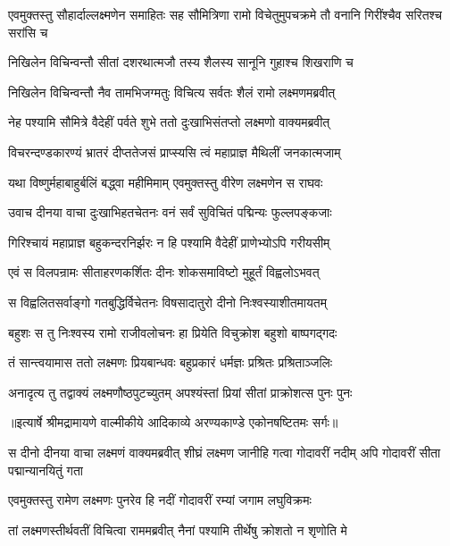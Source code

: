 \threelineshloka
{एवमुक्तस्तु सौहार्दाल्लक्ष्मणेन समाहितः}
{सह सौमित्रिणा रामो विचेतुमुपचक्रमे}
{तौ वनानि गिरींश्चैव सरितश्च सरांसि च} %

\twolineshloka
{निखिलेन विचिन्वन्तौ सीतां दशरथात्मजौ}
{तस्य शैलस्य सानूनि गुहाश्च शिखराणि च} %

\twolineshloka
{निखिलेन विचिन्वन्तौ नैव तामभिजग्मतुः}
{विचित्य सर्वतः शैलं रामो लक्ष्मणमब्रवीत्} %

\twolineshloka
{नेह पश्यामि सौमित्रे वैदेहीं पर्वते शुभे}
{ततो दुःखाभिसंतप्तो लक्ष्मणो वाक्यमब्रवीत्} %

\twolineshloka
{विचरन्दण्डकारण्यं भ्रातरं दीप्ततेजसं}
{प्राप्स्यसि त्वं महाप्राज्ञ मैथिलीं जनकात्मजाम्} %

\twolineshloka
{यथा विष्णुर्महाबाहुर्बलिं बद्ध्वा महीमिमाम्}
{एवमुक्तस्तु वीरेण लक्ष्मणेन स राघवः} %

\twolineshloka
{उवाच दीनया वाचा दुःखाभिहतचेतनः}
{वनं सर्वं सुविचितं पद्मिन्यः फुल्लपङ्कजाः} %

\twolineshloka
{गिरिश्चायं महाप्राज्ञ बहुकन्दरनिर्झरः}
{न हि पश्यामि वैदेहीं प्राणेभ्योऽपि गरीयसीम्} %

\twolineshloka
{एवं स विलपन्रामः सीताहरणकर्शितः}
{दीनः शोकसमाविष्टो मुहूर्तं विह्वलोऽभवत्} %

\twolineshloka
{स विह्वलितसर्वाङ्गो गतबुद्धिर्विचेतनः}
{विषसादातुरो दीनो निःश्वस्याशीतमायतम्} %

\twolineshloka
{बहुशः स तु निःश्वस्य रामो राजीवलोचनः}
{हा प्रियेति विचुक्रोश बहुशो बाष्पगद्गदः} %

\twolineshloka
{तं सान्त्वयामास ततो लक्ष्मणः प्रियबान्धवः}
{बहुप्रकारं धर्मज्ञः प्रश्रितः प्रश्रिताञ्जलिः} %

\twolineshloka
{अनादृत्य तु तद्वाक्यं लक्ष्मणौष्ठपुटच्युतम्}
{अपश्यंस्तां प्रियां सीतां प्राक्रोशत्स पुनः पुनः} %


{॥इत्यार्षे श्रीमद्रामायणे वाल्मीकीये आदिकाव्ये अरण्यकाण्डे एकोनषष्टितमः सर्गः॥}


\threelineshloka
{स दीनो दीनया वाचा लक्ष्मणं वाक्यमब्रवीत्}
{शीघ्रं लक्ष्मण जानीहि गत्वा गोदावरीं नदीम्}
{अपि गोदावरीं सीता पद्मान्यानयितुं गता} %

\twolineshloka
{एवमुक्तस्तु रामेण लक्ष्मणः पुनरेव हि}
{नदीं गोदावरीं रम्यां जगाम लघुविक्रमः} %

\twolineshloka
{तां लक्ष्मणस्तीर्थवतीं विचित्वा राममब्रवीत्}
{नैनां पश्यामि तीर्थेषु क्रोशतो न शृणोति मे} %


